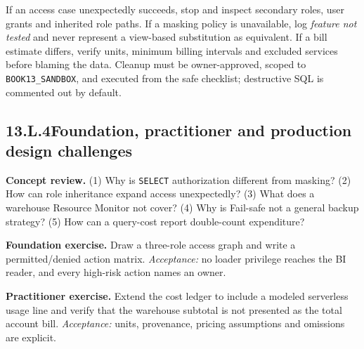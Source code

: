 \documentclass[11pt,twoside]{article}
\newcommand{\topic}[2]{\subsection*{#1\quad #2}}
\begin{document}
If an access case unexpectedly succeeds, stop and inspect secondary roles, user grants and inherited role paths. If a masking policy is unavailable, log \emph{feature not tested} and never represent a view-based substitution as equivalent. If a bill estimate differs, verify units, minimum billing intervals and excluded services before blaming the data. Cleanup must be owner-approved, scoped to \texttt{BOOK13\_SANDBOX}, and executed from the safe checklist; destructive SQL is commented out by default.
\topic{13.L.4}{Foundation, practitioner and production design challenges}
\textbf{Concept review.} (1) Why is \texttt{SELECT} authorization different from masking? (2) How can role inheritance expand access unexpectedly? (3) What does a warehouse Resource Monitor not cover? (4) Why is Fail-safe not a general backup strategy? (5) How can a query-cost report double-count expenditure?

\textbf{Foundation exercise.} Draw a three-role access graph and write a permitted/denied action matrix. \emph{Acceptance:} no loader privilege reaches the BI reader, and every high-risk action names an owner.

\textbf{Practitioner exercise.} Extend the cost ledger to include a modeled serverless usage line and verify that the warehouse subtotal is not presented as the total account bill. \emph{Acceptance:} units, provenance, pricing assumptions and omissions are explicit.
\end{document}
